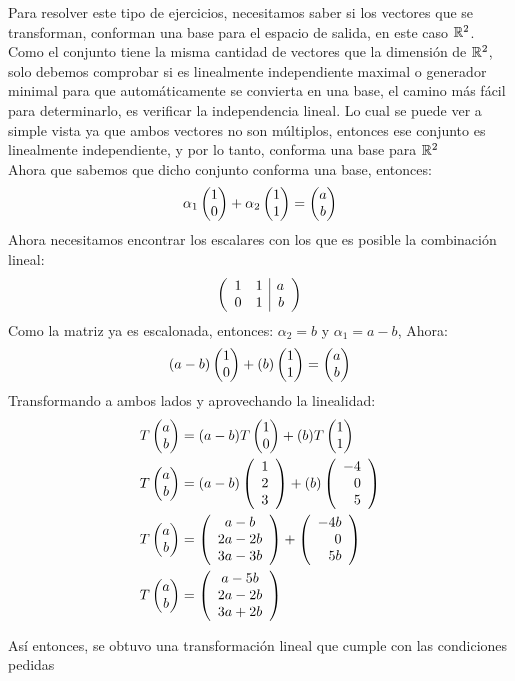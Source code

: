 \begin{sol}
    Para resolver este tipo de ejercicios, necesitamos saber si los vectores que se transforman, conforman una base para el espacio de salida, en este caso $\rdos$.\\
    
    
    Como el conjunto  tiene la misma cantidad de vectores que la dimensión de $\rdos$, solo debemos comprobar si es linealmente independiente maximal o generador minimal para que automáticamente se convierta en una base, el camino más fácil para determinarlo, es verificar la independencia lineal. Lo cual se puede ver a simple vista ya que ambos vectores no son múltiplos, entonces ese conjunto es linealmente independiente, y por lo tanto, conforma una base para $\rdos$\\
    
    Ahora que sabemos que dicho conjunto conforma una base, entonces:
    $$\alpha_1 \vectrdos{1}{0} + \alpha_2 \vectrdos{1}{1} = \vectrdos{a}{b}$$
    Ahora necesitamos encontrar los escalares con los que es posible la combinación lineal:
    $$\reducir{rr|r}{
        1&1&a\\
        0&1&b
    }$$
    Como la matriz ya es escalonada, entonces: $\alpha_2 = b$ y $\alpha_1 = a-b$, Ahora:
    $$(a-b) \vectrdos{1}{0} + (b) \vectrdos{1}{1} = \vectrdos{a}{b}$$
    Transformando a ambos lados y aprovechando la linealidad:
    \begin{align*}
        T\vectrdos{a}{b} &= (a-b)T\vectrdos{1}{0} + (b) T\vectrdos{1}{1}\\
        T\vectrdos{a}{b}&= (a-b)\vectrtres{1}{2}{3} + (b)\vectrtres{-4}{0}{5}\\
        T\vectrdos{a}{b}&= \vectrtrescent{a-b}{2a-2b}{3a-3b} + \vectrtres{-4b}{0}{5b}\\
        T\vectrdos{a}{b}&= \vectrtrescent{a-5b}{2a-2b}{3a + 2b}
    \end{align*}

    Así entonces, se obtuvo una transformación lineal que cumple con las condiciones pedidas
    
    
    
\end{sol}

